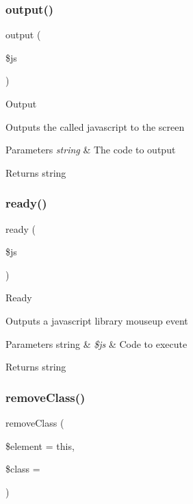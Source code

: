 \subsubsection{\texorpdfstring{output()}{output()}}
{\footnotesize\ttfamily output (\begin{DoxyParamCaption}\item[{}]{\$js }\end{DoxyParamCaption})}

Output

Outputs the called javascript to the screen


\begin{DoxyParams}{Parameters}
{\em string} & The code to output \\
\hline
\end{DoxyParams}
\begin{DoxyReturn}{Returns}
string 
\end{DoxyReturn}
\mbox{\label{class_c_i___javascript_a00997e6137ed7dc0de0159ed143a107b}} 
\subsubsection{\texorpdfstring{ready()}{ready()}}
{\footnotesize\ttfamily ready (\begin{DoxyParamCaption}\item[{}]{\$js }\end{DoxyParamCaption})}

Ready

Outputs a javascript library mouseup event


\begin{DoxyParams}[1]{Parameters}
string & {\em \$js} & Code to execute \\
\hline
\end{DoxyParams}
\begin{DoxyReturn}{Returns}
string 
\end{DoxyReturn}
\mbox{\label{class_c_i___javascript_a909e52e0a7e3ddd7e6520965618d50f4}} 
\subsubsection{\texorpdfstring{remove\+Class()}{removeClass()}}
{\footnotesize\ttfamily remove\+Class (\begin{DoxyParamCaption}\item[{}]{\$element = {\ttfamily \textquotesingle{}this\textquotesingle{}},  }\item[{}]{\$class = {\ttfamily \textquotesingle{}\textquotesingle{}} }\end{DoxyParamCaption})}

